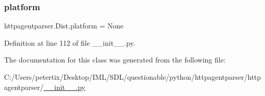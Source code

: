 \subsubsection{\texorpdfstring{platform}{platform}}
{\footnotesize\ttfamily httpagentparser.\+Dist.\+platform = None\hspace{0.3cm}{\ttfamily [static]}}



Definition at line 112 of file \+\_\+\+\_\+init\+\_\+\+\_\+.\+py.



The documentation for this class was generated from the following file\+:\begin{DoxyCompactItemize}
\item 
C\+:/\+Users/petertix/\+Desktop/\+I\+M\+L/\+S\+D\+L/questionable/python/httpagentparser/httpagentparser/\hyperlink{____init_____8py}{\+\_\+\+\_\+init\+\_\+\+\_\+.\+py}\end{DoxyCompactItemize}
